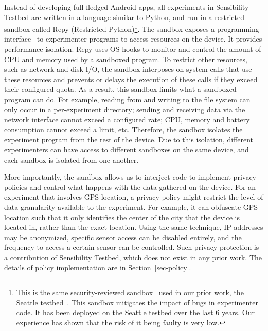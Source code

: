 Instead of developing full-fledged Android apps, all 
experiments in Sensibility Testbed are written in a language
similar to Python, and run in a restricted %
sandbox called Repy (Restricted Python)\footnote{This is the 
same security-reviewed sandbox~\cite{cappos2010retaining} used in
our prior work, the Seattle testbed~\cite{seattle}. This sandbox
mitigates the impact of bugs in experimenter code. It
has been deployed on the Seattle testbed over the last 6 years.
Our experience has shown that the risk of it being faulty is
very low.}. The sandbox exposes a programming 
interface~\cite{repyv2} to experimenter programs to access 
resources on the device. It provides performance isolation.
Repy uses OS hooks to monitor and control the amount of 
CPU and memory used by a sandboxed program. To restrict 
other resources, such as network and disk I/O, the sandbox 
interposes on system calls that use these resources and 
prevents or delays the execution of these calls if they exceed 
their configured quota. As a result, this sandbox limits 
what a sandboxed program can do. For example, reading from and writing to the file system can
only occur in a per-experiment directory; sending and receiving
data via the network interface cannot exceed a configured rate;
CPU, memory and battery consumption cannot exceed a limit, etc.
Therefore, the sandbox isolates the experiment program from 
the rest of the device. Due to this isolation, different experimenters
can have access to different sandboxes on the same device,
and each sandbox is isolated from one another.

More importantly, the sandbox allows us to interject
code to implement privacy policies and control what happens with
the data gathered on the device. For  an experiment
that involves GPS location, a privacy policy might restrict the
level of data granularity available to the experiment. For example, it can
obfuscate GPS location such that it only identifies the center
of the city that the device is located in, rather than the exact
location. Using the same technique, IP addresses may be anonymized, 
specific sensor access can be disabled entirely, and the frequency to 
access a certain sensor can be controlled. Such privacy
protection is a contribution of Sensibility Testbed, which does
not exist in any prior work. The details of policy implementation 
are in Section~\ref{sec-policy}.

